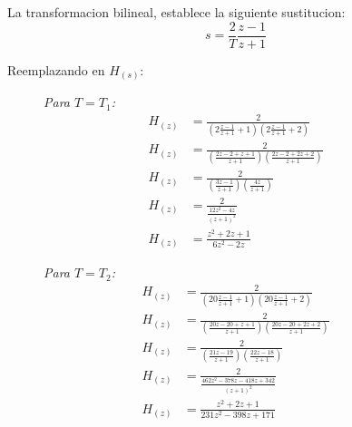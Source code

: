 \documentclass[a4paper,12pt]{report}
\begin{document}
\begin{enumerate}[label=\alph*), left=0pt]
                La transformacion bilineal, establece la siguiente sustitucion:
                \begin{equation}
                    \label{bilineal}
                    s = \frac{2}{T} \frac{z - 1}{z + 1}
                \end{equation}

                Reemplazando en $H_{(s)}$:
                \begin{figure}[!h]
                    \centering
                    \begin{minipage}{0.4\textwidth}
                        \centering
                        \textit{Para $T = T_1$:}
                        \begin{align*}
                            H_{(z)} &= \frac{2}{\left(2\frac{z - 1}{z + 1} + 1\right)\left(2\frac{z - 1}{z + 1} + 2\right)}\\
                            H_{(z)} &= \frac{2}{\left(\frac{2z - 2 + z + 1}{z + 1}\right)\left(\frac{2z - 2 + 2z + 2}{z + 1}\right)}\\
                            H_{(z)} &= \frac{2}{\left(\frac{3z - 1}{z + 1}\right)\left(\frac{4z}{z + 1}\right)}\\
                            H_{(z)} &= \frac{2}{\frac{12z^2 - 4z}{(z + 1)^2}}\\
                            H_{(z)} &= \frac{z^2 + 2z + 1}{6z^2 - 2z}
                        \end{align*}
                    \end{minipage}
                    \hspace{0.5cm}
                    \centering
                    \begin{minipage}{0.4\textwidth}
                        \centering
                        \textit{Para $T = T_2$:}
                        \begin{align*}
                            H_{(z)} &= \frac{2}{\left(20\frac{z - 1}{z + 1} + 1\right)\left(20\frac{z - 1}{z + 1} + 2\right)}\\
                            H_{(z)} &= \frac{2}{\left(\frac{20z - 20 + z + 1}{z + 1}\right)\left(\frac{20z - 20 + 2z + 2}{z + 1}\right)}\\
                            H_{(z)} &= \frac{2}{\left(\frac{21z - 19}{z + 1}\right)\left(\frac{22z - 18}{z + 1}\right)}\\
                            H_{(z)} &= \frac{2}{\frac{462z^2 - 378z - 418z + 342}{(z + 1)^2}}\\
                            H_{(z)} &= \frac{z^2 + 2z + 1}{231z^2 - 398z + 171}
                        \end{align*}
                    \end{minipage}
                \end{figure}


\end{enumerate}
\end{document}
